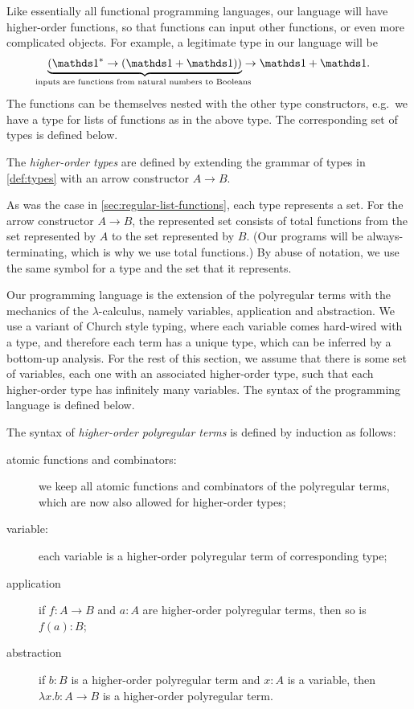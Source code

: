 Like essentially all functional programming languages, our language will have higher-order functions, so that  functions can input other functions, or even more complicated objects. For example, a legitimate type in our language will be 
\begin{align*}
\myunderbrace{(\onetype^* \to (\onetype + \onetype))}{inputs are functions from natural numbers to Booleans} \to \onetype + \onetype.
\end{align*}
 The functions can be themselves nested with the other type constructors, e.g.~we have a type for lists of functions as in the above type.  The corresponding set of types is defined below.





\begin{definition}
     \label{def:higher-order-types}  The \emph{higher-order types} are defined by extending the grammar of types in \cref{def:types} with an arrow constructor $A \to B$. 
\end{definition}

As was the case in \cref{sec:regular-list-functions}, each type represents a set. For the arrow constructor $A \to B$, the represented set consists of total functions from the set represented by $A$ to the set represented by $B$. (Our programs will be always-terminating, which is why we use total functions.) By abuse of notation, we use the same symbol for a type and the set that it represents.


Our programming language is the extension of the polyregular terms with the mechanics of the  $\lambda$-calculus, namely variables, application and abstraction. We use a variant of Church style typing, where each variable comes hard-wired with a type, and therefore each term has a unique type, which can be inferred by a bottom-up analysis. For the rest of this section, we assume that there is some set of variables, each one with an associated higher-order type, such that each higher-order type has infinitely many variables. The syntax of the programming language is defined below.
\begin{definition}
    \label{def:higher-order-terms}
    The syntax of \emph{higher-order  polyregular terms} is  defined by induction as follows:
        \begin{description}
            \item[atomic functions and combinators:] we keep all atomic functions and combinators of the polyregular terms, which are now also allowed for higher-order types; 
             \item[variable:]        each variable is a higher-order polyregular term of corresponding type;
            \item [application] if $f : A \to B$ and $a : A$ are higher-order polyregular terms, then so is $f(a) : B$;
            \item [abstraction] if $b : B$ is a higher-order polyregular term and $x : A$ is a variable, then $\lambda x. b : A \to B$ is a  higher-order polyregular term.
        \end{description}
\end{definition}

